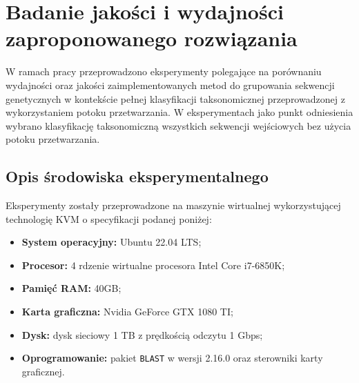 \cleardoublepage
\section{Badanie jakości i wydajności zaproponowanego rozwiązania}

    W ramach pracy przeprowadzono eksperymenty polegające na porównaniu wydajności oraz jakości zaimplementowanych metod do grupowania sekwencji genetycznych w kontekście pełnej klasyfikacji taksonomicznej przeprowadzonej z wykorzystaniem potoku przetwarzania. W eksperymentach jako punkt odniesienia wybrano klasyfikację taksonomiczną wszystkich sekwencji wejściowych bez użycia potoku przetwarzania.

    \subsection{Opis środowiska eksperymentalnego}

        Eksperymenty zostały przeprowadzone na maszynie wirtualnej wykorzystującej technologię KVM o specyfikacji podanej poniżej:


            \begin{itemize}
                \item {
                    \textbf{System operacyjny:} Ubuntu 22.04 LTS;
                }
                \item {
                    \textbf{Procesor:} 4 rdzenie wirtualne procesora Intel Core i7-6850K;
                }
                \item {
                    \textbf{Pamięć RAM:} 40GB;
                }
                \item {
                    \textbf{Karta graficzna:} Nvidia GeForce GTX 1080 TI;
                }
                \item {
                    \textbf{Dysk:} dysk sieciowy 1 TB z prędkością odczytu 1 Gbps;
                }
                \item {
                    \textbf{Oprogramowanie:} pakiet \texttt{BLAST} w wersji 2.16.0 oraz sterowniki karty graficznej.
                }
            \end{itemize}

